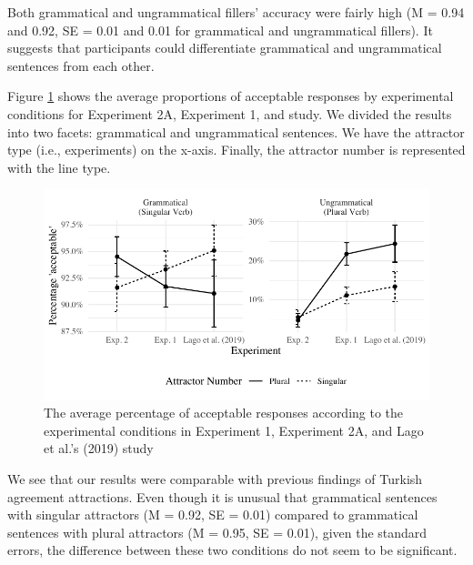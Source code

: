 Both grammatical and ungrammatical fillers' accuracy were fairly high (M = 0.94 and 0.92, SE = 0.01 and 0.01 for grammatical and ungrammatical fillers). It suggests that participants could differentiate grammatical and ungrammatical sentences from each other.

Figure \ref{fig:exp2AvgResponse} shows the average proportions of acceptable responses by experimental conditions for Experiment 2A, Experiment 1, and \cites{LagoEtAl2019} study. We divided the results into two facets: grammatical and ungrammatical sentences. We have the attractor type (i.e., experiments) on the x-axis. Finally, the attractor number is represented with the line type. 

\begin{knitrout}
\color{fgcolor}\begin{figure}[hbt!]

{\centering \includegraphics[width=\linewidth]{figure/exp2AvgResponse-1} 

}

\caption[The average percentage of acceptable responses according to the experimental conditions in Experiment 1, Experiment 2A, and Lago et al.'s (2019) study]{The average percentage of acceptable responses according to the experimental conditions in Experiment 1, Experiment 2A, and Lago et al.'s (2019) study}\label{fig:exp2AvgResponse}
\end{figure}

\end{knitrout}

We see that our results were comparable with previous findings of Turkish agreement attractions. Even though it is unusual that grammatical sentences with singular attractors (M = 0.92, SE = 0.01) compared to grammatical sentences with plural attractors (M = 0.95, SE = 0.01), given the standard errors, the difference between these two conditions do not seem to be significant. 

